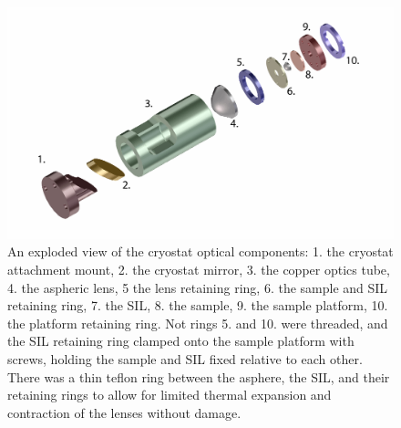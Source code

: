 \begin{figure}[h!]
\centering
\includegraphics[width = 1.1\textwidth]{Holder4.jpg}
\caption{ \doublespacing An exploded view of the cryostat optical components: 1. the cryostat attachment mount, 2. the cryostat mirror, 3. the copper optics tube, 4. the aspheric lens, 5 the lens retaining ring, 6. the sample and SIL retaining ring, 7. the SIL, 8. the sample, 9. the sample platform, 10. the platform retaining ring. Not rings 5. and 10. were threaded, and the SIL retaining ring clamped onto the sample platform with screws, holding the sample and SIL fixed relative to each other. There was a thin teflon ring between the asphere, the SIL, and their retaining rings to allow for limited thermal expansion and contraction of the lenses without damage.}
\label{mount}
\end{figure}
